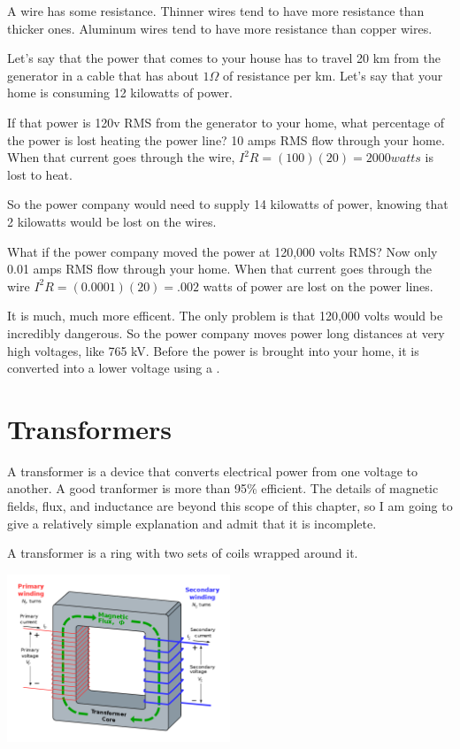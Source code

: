 A wire has some resistance. Thinner wires tend to have more resistance
than thicker ones. Aluminum wires tend to have more resistance than
copper wires.

Let's say that the power that comes to your house has to travel 20 km
from the generator in a cable that has about $1 \Omega$ of resistance
per km.  Let's say that your home is consuming 12 kilowatts of power.

If that power is 120v RMS from the generator to your home, what
percentage of the power is lost heating the power line? 10 amps RMS
flow through your home. When that current goes through the wire, $I^2
R = (100)(20) = 2000 watts$ is lost to heat.

So the power company would need to supply 14 kilowatts of power,
knowing that 2 kilowatts would be lost on the wires.

What if the power company moved the power at 120,000 volts RMS? Now
only 0.01 amps RMS flow through your home. When that current goes
through the wire $I^2R = (0.0001)(20) = .002$ watts of power are lost
on the power lines.

It is much, much more efficent. The only problem is that 120,000 volts
would be incredibly dangerous.  So the power company moves power long
distances at very high voltages, like 765 kV.  Before the power is
brought into your home, it is converted into a lower voltage using a
.

\section{Transformers}

A transformer is a device that converts electrical power from one
voltage to another. A good tranformer is more than 95\% efficient. The
details of magnetic fields, flux, and inductance are beyond this scope
of this chapter, so I am going to give a relatively simple explanation
and admit that it is incomplete.

A transformer is a ring with two sets of coils wrapped around it.

\includegraphics[width=0.5\textwidth]{transformer.png}

